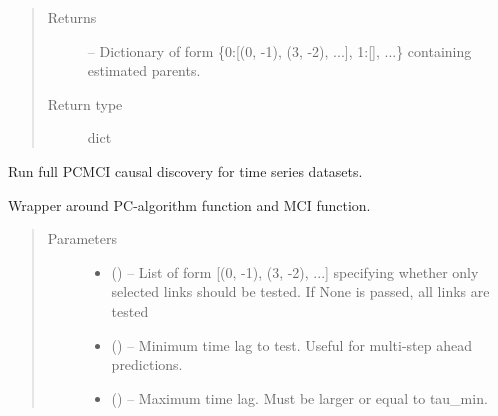 \documentclass[letterpaper,10pt,english]{sphinxmanual}
\begin{document}
\begin{fulllineitems}
\begin{fulllineitems}
\begin{quote}
\begin{description}
\begin{itemize}
\end{itemize}

\item[{Returns}] \leavevmode
{} -- Dictionary of form \{0:{[}(0, -1), (3, -2), ...{]}, 1:{[}{]}, ...\}
containing estimated parents.

\item[{Return type}] \leavevmode
dict

\end{description}\end{quote}

\end{fulllineitems}


\begin{fulllineitems}
\label{\detokenize{index:tigramite.pcmci.PCMCI.run_pcmci}}
Run full PCMCI causal discovery for time series datasets.

Wrapper around PC-algorithm function and MCI function.
\begin{quote}\begin{description}
\item[{Parameters}] \leavevmode\begin{itemize}
\item {} 
 () -- List of form {[}(0, -1), (3, -2), ...{]}
specifying whether only selected links should be tested. If None is
passed, all links are tested

\item {} 
 (\sphinxstyleliteralemphasis{, }) -- Minimum time lag to test. Useful for multi-step ahead predictions.

\item {} 
 (\sphinxstyleliteralemphasis{, }) -- Maximum time lag. Must be larger or equal to tau\_min.


\end{itemize}
\end{description}
\end{quote}
\end{fulllineitems}
\end{fulllineitems}
\end{document}
